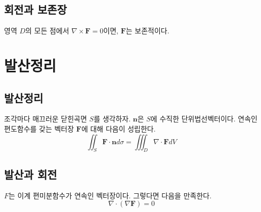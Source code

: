 \documentclass[chapter, oneside]{oblivoir}
\begin{document}
\subsection{회전과 보존장}
영역 $D$의 모든 점에서 $\nabla \times \textbf{F} = 0$이면, $\textbf{F}$는 보존적이다.

\section{발산정리}
\subsection{발산정리}
조각마다 매끄러운 닫힌곡면 $S$를 생각하자. $\textbf{n}$은 $S$에 수직한 단위법선벡터이다. 연속인 편도함수를 갖는 벡터장 $\textbf{F}$에 대해 다음이 성립한다.
$$\iint_S \textbf{F} \cdot \textbf{n} d\sigma = \iiint_D \nabla \cdot \textbf{F} dV $$

\subsection{발산과 회전}
$F$는 이계 편미분함수가 연속인 벡터장이다. 그렇다면 다음을 만족한다.
$$ \nabla \cdot \left( \nabla \textbf{F} \right) = 0 $$



 
\end{document}
